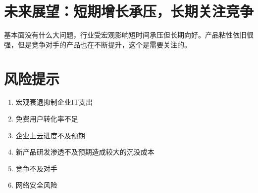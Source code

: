 \section{未来展望：短期增长承压，长期关注竞争}
基本面没有什么大问题，行业受宏观影响短时间承压但长期向好。产品粘性依旧很强，但是竞争对手的产品也在不断提升，这个是需要关注的。
\section{风险提示}
\begin{enumerate}
    \item 宏观衰退抑制企业IT支出
    \item 免费用户转化率不足
    \item 企业上云进度不及预期
    \item 新产品研发渗透不及预期造成较大的沉没成本
    \item 竞争不及对手
    \item 网络安全风险
\end{enumerate}
